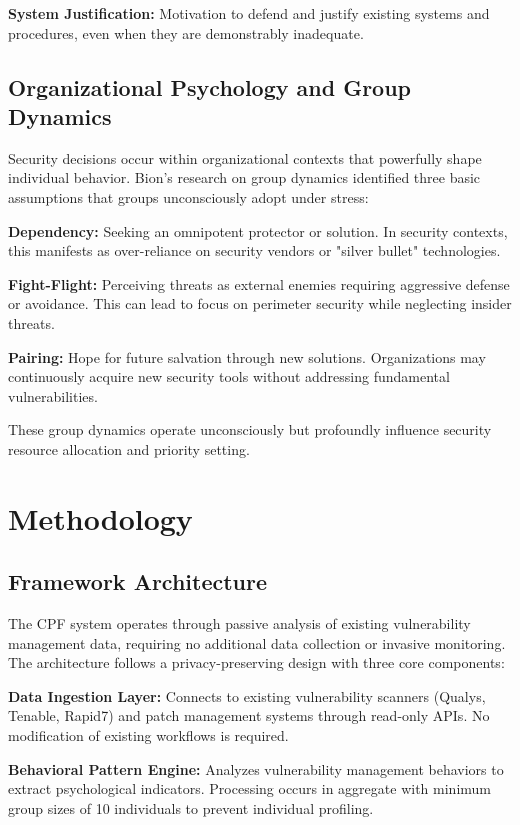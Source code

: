 \documentclass[10pt, twocolumn]{article}
\begin{document}
\textbf{System Justification:} Motivation to defend and justify existing systems and procedures, even when they are demonstrably inadequate\cite{jost2004}.

\subsection{Organizational Psychology and Group Dynamics}

Security decisions occur within organizational contexts that powerfully shape individual behavior. Bion's research on group dynamics\cite{bion1961} identified three basic assumptions that groups unconsciously adopt under stress:

\textbf{Dependency:} Seeking an omnipotent protector or solution. In security contexts, this manifests as over-reliance on security vendors or "silver bullet" technologies.

\textbf{Fight-Flight:} Perceiving threats as external enemies requiring aggressive defense or avoidance. This can lead to focus on perimeter security while neglecting insider threats.

\textbf{Pairing:} Hope for future salvation through new solutions. Organizations may continuously acquire new security tools without addressing fundamental vulnerabilities.

These group dynamics operate unconsciously but profoundly influence security resource allocation and priority setting.

\section{Methodology}

\subsection{Framework Architecture}

The CPF system operates through passive analysis of existing vulnerability management data, requiring no additional data collection or invasive monitoring. The architecture follows a privacy-preserving design with three core components:

\textbf{Data Ingestion Layer:} Connects to existing vulnerability scanners (Qualys, Tenable, Rapid7) and patch management systems through read-only APIs. No modification of existing workflows is required.

\textbf{Behavioral Pattern Engine:} Analyzes vulnerability management behaviors to extract psychological indicators. Processing occurs in aggregate with minimum group sizes of 10 individuals to prevent individual profiling.
\end{document}

